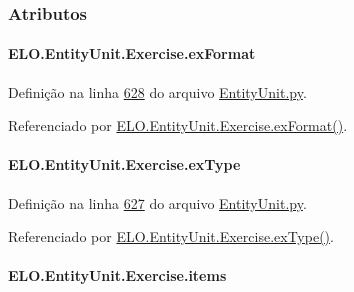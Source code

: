 \subsubsection{Atributos}
\hypertarget{classELO_1_1EntityUnit_1_1Exercise_a0d17db96aa0caa63df47795c50818e9f}{
\paragraph[{ex\-Format}]{\setlength{\rightskip}{0pt plus 5cm}E\-L\-O.\-Entity\-Unit.\-Exercise.\-ex\-Format}}\label{classELO_1_1EntityUnit_1_1Exercise_a0d17db96aa0caa63df47795c50818e9f}


Definição na linha \hyperlink{EntityUnit_8py_source_l00628}{628} do arquivo \hyperlink{EntityUnit_8py_source}{Entity\-Unit.\-py}.



Referenciado por \hyperlink{classELO_1_1EntityUnit_1_1Exercise_a5c495ffe5e6e424c1e4754dd07c06bc7}{E\-L\-O.\-Entity\-Unit.\-Exercise.\-ex\-Format()}.

\hypertarget{classELO_1_1EntityUnit_1_1Exercise_af982926b59b32980803f93f40b383d77}{
\paragraph[{ex\-Type}]{\setlength{\rightskip}{0pt plus 5cm}E\-L\-O.\-Entity\-Unit.\-Exercise.\-ex\-Type}}\label{classELO_1_1EntityUnit_1_1Exercise_af982926b59b32980803f93f40b383d77}


Definição na linha \hyperlink{EntityUnit_8py_source_l00627}{627} do arquivo \hyperlink{EntityUnit_8py_source}{Entity\-Unit.\-py}.



Referenciado por \hyperlink{classELO_1_1EntityUnit_1_1Exercise_aee62dc52d043fce780716fb395d88131}{E\-L\-O.\-Entity\-Unit.\-Exercise.\-ex\-Type()}.

\hypertarget{classELO_1_1EntityUnit_1_1Exercise_a14ec766ff723672be49ea5c9438744c8}{
\paragraph[{items}]{\setlength{\rightskip}{0pt plus 5cm}E\-L\-O.\-Entity\-Unit.\-Exercise.\-items}}\label{classELO_1_1EntityUnit_1_1Exercise_a14ec766ff723672be49ea5c9438744c8}


